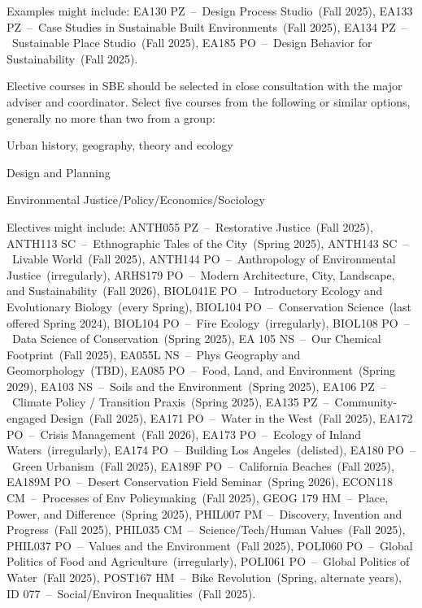 \documentclass{article}\usepackage[]{graphicx}\usepackage[]{xcolor}
\newenvironment{itemize*}%
  {\begin{itemize}%
    \setlength{\itemsep}{0pt}%
    \setlength{\parskip}{0pt}}%
  {\end{itemize}}
\begin{document}
\begin{description}
Examples might include: EA130 PZ~--~Design Process Studio~(Fall 2025), EA133 PZ~--~Case Studies in Sustainable Built Environments~(Fall 2025), EA134 PZ~--~Sustainable Place Studio~(Fall 2025), EA185 PO~--~Design Behavior for Sustainability~(Fall 2025).



\item[Electives (5)] Elective courses in SBE should be selected in close consultation with the major adviser and coordinator. Select five courses from the following or similar options, generally no more than two from a group:
\begin{itemize*}
  \item Urban history, geography, theory and ecology
  \item Design and Planning
  \item Environmental Justice/Policy/Economics/Sociology
\end{itemize*}

\noindent Electives might include: ANTH055 PZ~--~Restorative Justice~(Fall 2025), ANTH113 SC~--~Ethnographic Tales of the City~(Spring 2025), ANTH143 SC~--~Livable World~(Fall 2025), ANTH144 PO~--~Anthropology of Environmental Justice~(irregularly), ARHS179 PO~--~Modern Architecture, City, Landscape, and Sustainability~(Fall 2026), BIOL041E PO~--~Introductory Ecology and Evolutionary Biology~(every Spring), BIOL104 PO~--~Conservation Science~(last offered Spring 2024), BIOL104 PO~--~Fire Ecology~(irregularly), BIOL108 PO~--~Data Science of Conservation~(Spring 2025), EA 105 NS~--~Our Chemical Footprint~(Fall 2025), EA055L NS~--~Phys Geography and Geomorphology~(TBD), EA085 PO~--~Food, Land, and Environment~(Spring 2029), EA103 NS~--~Soils and the Environment~(Spring 2025), EA106 PZ~--~Climate Policy / Transition Praxis~(Spring 2025), EA135 PZ~--~Community-engaged Design~(Fall 2025), EA171 PO~--~Water in the West~(Fall 2025), EA172 PO~--~Crisis Management~(Fall 2026), EA173 PO~--~Ecology of Inland Waters~(irregularly), EA174 PO~--~Building Los Angeles~(delisted), EA180 PO~--~Green Urbanism~(Fall 2025), EA189F PO~--~California Beaches~(Fall 2025), EA189M PO~--~Desert Conservation Field Seminar~(Spring 2026), ECON118 CM~--~Processes of Env Policymaking~(Fall 2025), GEOG 179 HM~--~Place, Power, and Difference~(Spring 2025), PHIL007 PM~--~Discovery, Invention and Progress~(Fall 2025), PHIL035 CM~--~Science/Tech/Human Values~(Fall 2025), PHIL037 PO~--~Values and the Environment~(Fall 2025), POLI060 PO~--~Global Politics of Food and Agriculture~(irregularly), POLI061 PO~--~Global Politics of Water~(Fall 2025), POST167 HM~--~Bike Revolution~(Spring, alternate years), ID 077~--~Social/Environ Inequalities~(Fall 2025).



\end{description}
\end{document}
